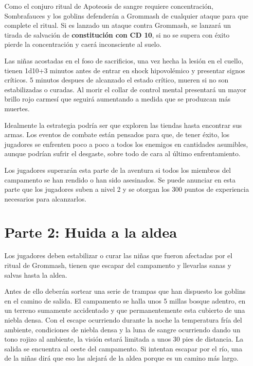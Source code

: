 \documentclass[10pt,twoside,twocolumn,openany]{dndbook}
\begin{document}
Como el conjuro ritual de Apoteosis de sangre requiere concentración, Sombrafauces y los goblins 
defenderán a Grommash de cualquier ataque para que complete el ritual. Si es lanzado un ataque 
contra Grommash, se lanzará un tirada de salvación de \textbf{constitución con CD 10}, si no se 
supera con éxito pierde la concentración y caerá inconsciente al suelo.

Las niñas acostadas en el foso de sacrificios, una vez hecha la lesión en el cuello, tienen 1d10+3 
minutos antes de entrar en shock hipovolémico y presentar signos críticos. 5 minutos despues de 
alcanzado el estado crítico, mueren si no son estabilizadas o curadas. Al morir el collar de 
control mental presentará un mayor brillo rojo carmesí que seguirá aumentando a medida que se 
produzcan más muertes.

Idealmente la estrategia podría ser que exploren las tiendas hasta encontrar sus armas. Los 
eventos de combate están pensados para que, de tener éxito, los jugadores se enfrenten poco a 
poco a todos los enemigos en cantidades asumibles, aunque podrían sufrir el desgaste, sobre todo 
de cara al último enfrentamiento.

Los jugadores superarán esta parte de la aventura si todos los miembros del campamento se han 
rendido o han sido asesinados. Se puede anunciar en esta parte que los jugadores suben a nivel 2
y se otorgan los 300 puntos de experiencia necesarios para alcanzarlos.


\section{Parte 2: Huida a la aldea}

Los jugadores deben estabilizar o curar las niñas que fueron afectadas por el ritual de Grommash, 
tienen que escapar del campamento y llevarlas sanas y salvas hasta la aldea. 

Antes de ello deberán sortear una serie de trampas que han dispuesto los goblins en el camino de 
salida. El campamento se halla unos 5 millas bosque adentro, en un terreno sumamente accidentado y 
que permanentemente esta cubierto de una niebla densa. Con el escape ocurriendo durante la noche 
la temperatura fría del ambiente, condiciones de niebla densa y la luna de sangre ocurriendo dando 
un tono rojizo al ambiente, la visión estará limitada a unos 30 pies de distancia. La salida se 
encuentra al oeste del campamento. Si intentan escapar por el río, una de la niñas dirá que eso 
las alejará de la aldea porque es un camino más largo.
\end{document}
